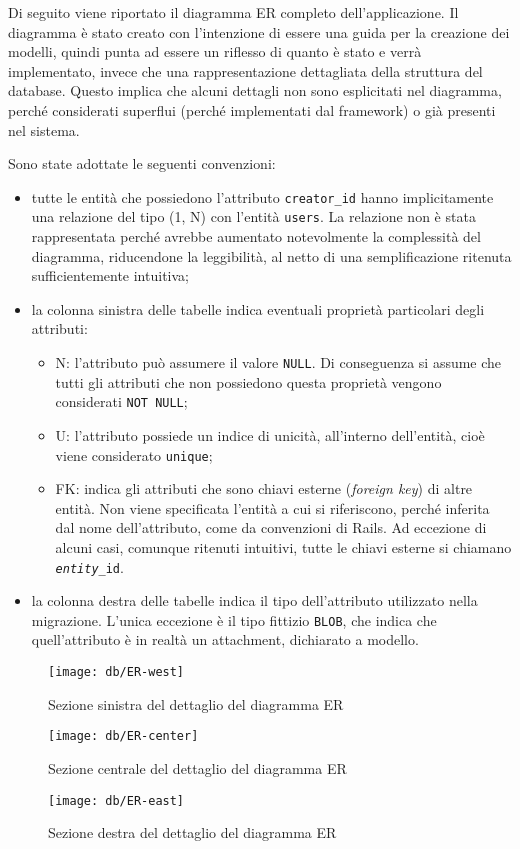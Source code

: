 Di seguito viene riportato il diagramma ER completo dell'applicazione. Il diagramma è stato creato con l'intenzione di essere una guida per la creazione dei modelli, quindi punta ad essere un riflesso di quanto è stato e verrà implementato, invece che una rappresentazione dettagliata della struttura del database. Questo implica che alcuni dettagli non sono esplicitati nel diagramma, perché considerati superflui (perché implementati dal framework) o già presenti nel sistema.

\noindent Sono state adottate le seguenti convenzioni:
\begin{itemize}
	\item tutte le entità che possiedono l'attributo \verb|creator_id| hanno implicitamente una relazione del tipo (1, N) con l'entità \verb|users|. La relazione non è stata rappresentata perché avrebbe aumentato notevolmente la complessità del diagramma, riducendone la leggibilità, al netto di una semplificazione ritenuta sufficientemente intuitiva;
	\item la colonna sinistra delle tabelle indica eventuali proprietà particolari degli attributi:
	\begin{itemize}
		\item N: l'attributo può assumere il valore \verb|NULL|. Di conseguenza si assume che tutti gli attributi che non possiedono questa proprietà vengono considerati \verb|NOT NULL|;
		\item U: l'attributo possiede un indice di unicità, all'interno dell'entità, cioè viene considerato \verb|unique|;
		\item FK: indica gli attributi che sono chiavi esterne (\emph{foreign key}) di altre entità. Non viene specificata l'entità a cui si riferiscono, perché inferita dal nome dell'attributo, come da convenzioni di Rails. Ad eccezione di alcuni casi, comunque ritenuti intuitivi, tutte le chiavi esterne si chiamano \texttt{\emph{entity}\_id}.
	\end{itemize}
	\item la colonna destra delle tabelle indica il tipo dell'attributo utilizzato nella migrazione. L'unica eccezione è il tipo fittizio \verb|BLOB|, che indica che quell'attributo è in realtà un attachment, dichiarato a modello.
\end{itemize}

\begin{figure}[b]
	\texttt{[image: db/ER-west]}
	\caption{Sezione sinistra del dettaglio del diagramma ER}
	\label{fig:er-west}
\end{figure}

\begin{figure}[b]
	\texttt{[image: db/ER-center]}
	\caption{Sezione centrale del dettaglio del diagramma ER}
	\label{fig:er-center}
\end{figure}

\begin{figure}[b]
	\texttt{[image: db/ER-east]}
	\caption{Sezione destra del dettaglio del diagramma ER}
	\label{fig:er-east}
\end{figure}

